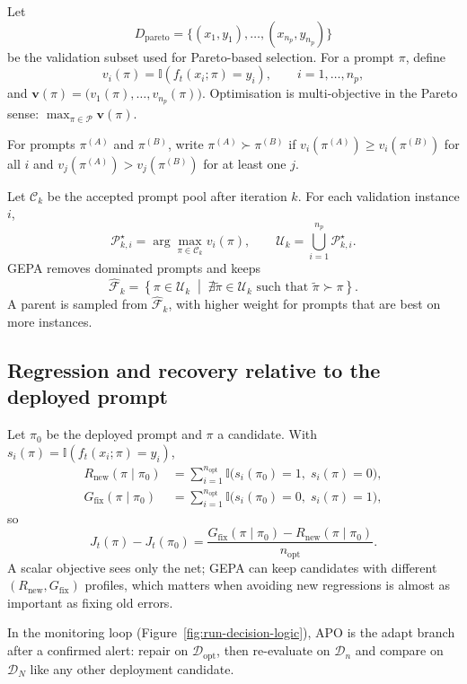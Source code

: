 Let
\begin{equation}
    D_{\mathrm{pareto}}=\{(x_1,y_1),\dots,(x_{n_p},y_{n_p})\}
\end{equation}
be the validation subset used for Pareto-based selection. For a prompt \(\pi\), define
\begin{equation}
    v_i(\pi)=\mathbb{I}\!\left(f_t(x_i;\pi)=y_i\right),
    \qquad i=1,\dots,n_p,
\end{equation}
and \(\mathbf{v}(\pi)=\bigl(v_1(\pi),\dots,v_{n_p}(\pi)\bigr)\). Optimisation is multi-objective in the Pareto sense: \(\max_{\pi\in\mathcal{P}} \mathbf{v}(\pi)\).

\begin{definition}
For prompts \(\pi^{(A)}\) and \(\pi^{(B)}\), write \(\pi^{(A)} \succ \pi^{(B)}\) if
\(v_i(\pi^{(A)}) \ge v_i(\pi^{(B)})\) for all \(i\) and \(v_j(\pi^{(A)}) > v_j(\pi^{(B)})\) for at least one \(j\).
\end{definition}

Let \(\mathcal{C}_k\) be the accepted prompt pool after iteration \(k\). For each validation instance \(i\),
\begin{equation}
    \mathcal{P}_{k,i}^\star
    =
    \arg\max_{\pi\in\mathcal{C}_k} v_i(\pi),
    \qquad
    \mathcal{U}_k
    =
    \bigcup_{i=1}^{n_p} \mathcal{P}_{k,i}^\star.
\end{equation}
GEPA removes dominated prompts and keeps
\begin{equation}
    \widehat{\mathcal{F}}_k
    =
    \left\{
        \pi\in\mathcal{U}_k
        \;\middle|\;
        \nexists \tilde{\pi}\in\mathcal{U}_k \text{ such that } \tilde{\pi}\succ \pi
    \right\}.
\end{equation}
A parent is sampled from \(\widehat{\mathcal{F}}_k\), with higher weight for prompts that are best on more instances.

\subsection{Regression and recovery relative to the deployed prompt}

Let \(\pi_0\) be the deployed prompt and \(\pi\) a candidate. With \(s_i(\pi)=\mathbb{I}\!\left(f_t(x_i;\pi)=y_i\right)\),
\begin{align}
    R_{\mathrm{new}}(\pi\mid\pi_0)
    &=
    \sum_{i=1}^{n_{\mathrm{opt}}}
    \mathbb{I}\bigl(s_i(\pi_0)=1,\;s_i(\pi)=0\bigr),
    \\
    G_{\mathrm{fix}}(\pi\mid\pi_0)
    &=
    \sum_{i=1}^{n_{\mathrm{opt}}}
    \mathbb{I}\bigl(s_i(\pi_0)=0,\;s_i(\pi)=1\bigr),
\end{align}
so
\begin{equation}
    J_t(\pi)-J_t(\pi_0)
    =
    \frac{G_{\mathrm{fix}}(\pi\mid\pi_0)-R_{\mathrm{new}}(\pi\mid\pi_0)}
    {n_{\mathrm{opt}}}.
\end{equation}
A scalar objective sees only the net; GEPA can keep candidates with different \((R_{\mathrm{new}},G_{\mathrm{fix}})\) profiles, which matters when avoiding new regressions is almost as important as fixing old errors.

In the monitoring loop (Figure~\ref{fig:run-decision-logic}), APO is the adapt branch after a confirmed alert: repair on \(\mathcal{D}_{\mathrm{opt}}\), then re-evaluate on \(\mathcal{D}_n\) and compare on \(\mathcal{D}_N\) like any other deployment candidate.
